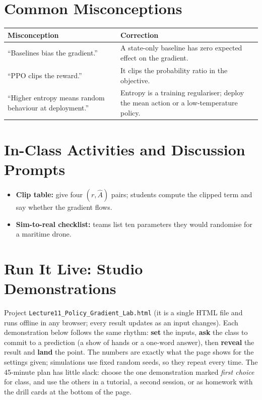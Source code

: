 \documentclass[11pt]{article}
\begin{document}
\section{Common Misconceptions}\begin{center}\small\renewcommand{\arraystretch}{1.35}\begin{tabularx}{\textwidth}{@{}>{\raggedright\arraybackslash}X >{\raggedright\arraybackslash}X@{}}\toprule\textbf{Misconception} & \textbf{Correction}\\\midrule``Baselines bias the gradient.'' & A state-only baseline has zero expected effect on the gradient.\\
``PPO clips the reward.'' & It clips the probability ratio in the objective.\\
``Higher entropy means random behaviour at deployment.'' & Entropy is a training regulariser; deploy the mean action or a low-temperature policy.\\\bottomrule\end{tabularx}\end{center}

\section{In-Class Activities and Discussion Prompts}\label{sec:act}\begin{itemize}\item \textbf{Clip table:} give four $(r,\hat A)$ pairs; students compute the clipped term and say whether the gradient flows.\item \textbf{Sim-to-real checklist:} teams list ten parameters they would randomise for a maritime drone.\end{itemize}

\section{Run It Live: Studio Demonstrations}\label{sec:live}

Project \texttt{Lecture11\_Policy\_Gradient\_Lab.html} (it is a single HTML file and runs offline in any browser; every result updates as an input changes). Each demonstration below follows the same rhythm: \textbf{set} the inputs, \textbf{ask} the class to commit to a prediction (a show of hands or a one-word answer), then \textbf{reveal} the result and \textbf{land} the point. The numbers are exactly what the page shows for the settings given; simulations use fixed random seeds, so they repeat every time. The 45-minute plan has little slack: choose the one demonstration marked \emph{first choice} for class, and use the others in a tutorial, a second session, or as homework with the drill cards at the bottom of the page.
\end{document}

